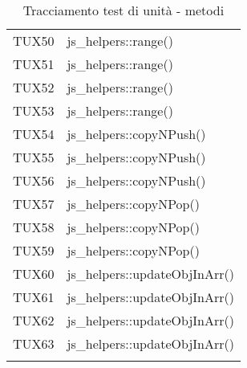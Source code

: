 \documentclass[PianoDiQualifica.tex]{subfiles}
\begin{document}
\begin{longtable}[H]{P{5cm}P{9cm}}
	TUX50 & js\_helpers::range() \\
	TUX51 & js\_helpers::range() \\
	TUX52 & js\_helpers::range() \\
	TUX53 & js\_helpers::range() \\
	TUX54 & js\_helpers::copyNPush() \\
	TUX55 & js\_helpers::copyNPush() \\
	TUX56 & js\_helpers::copyNPush() \\
	TUX57 & js\_helpers::copyNPop() \\
	TUX58 & js\_helpers::copyNPop() \\
	TUX59 & js\_helpers::copyNPop() \\
	TUX60 & js\_helpers::updateObjInArr() \\
	TUX61 & js\_helpers::updateObjInArr() \\
	TUX62 & js\_helpers::updateObjInArr() \\
	TUX63 & js\_helpers::updateObjInArr() \\
	\hiderowcolors
	\caption{Tracciamento test di unità - metodi}
\end{longtable}
	
\end{document}

